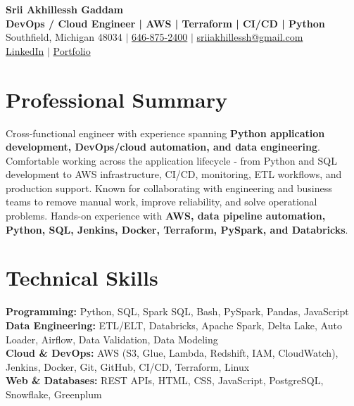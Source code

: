 \documentclass[letterpaper,10pt]{article}
\begin{document}
\fontsize{9.35pt}{10.45pt}\selectfont

\begin{center}
    {\LARGE \textbf{Srii Akhillessh Gaddam}} \\[-1pt]
    \textbf{DevOps / Cloud Engineer | AWS | Terraform | CI/CD | Python} \\[2pt]
    Southfield, Michigan 48034 $|$
    \href{tel:6468752400}{646-875-2400} $|$
    \href{mailto:sriiakhillessh@gmail.com}{sriiakhillessh@gmail.com} \\[1pt]
    \href{https://www.linkedin.com/in/srii-akhiilessh-gaddam-b48668191/}{LinkedIn} $|$
    \href{https://sriiakhillesshg.github.io/portfolio/}{Portfolio}
\end{center}
\vspace{-8pt}

\section{Professional Summary}
\small{Cross-functional engineer with experience spanning \textbf{Python application development, DevOps/cloud automation, and data engineering}. Comfortable working across the application lifecycle - from Python and SQL development to AWS infrastructure, CI/CD, monitoring, ETL workflows, and production support. Known for collaborating with engineering and business teams to remove manual work, improve reliability, and solve operational problems. Hands-on experience with \textbf{AWS, data pipeline automation, Python, SQL, Jenkins, Docker, Terraform, PySpark, and Databricks}.}

\section{Technical Skills}
\small{
\textbf{Programming:} Python, SQL, Spark SQL, Bash, PySpark, Pandas, JavaScript \\
\textbf{Data Engineering:} ETL/ELT, Databricks, Apache Spark, Delta Lake, Auto Loader, Airflow, Data Validation, Data Modeling \\
\textbf{Cloud \& DevOps:} AWS (S3, Glue, Lambda, Redshift, IAM, CloudWatch), Jenkins, Docker, Git, GitHub, CI/CD, Terraform, Linux \\
\textbf{Web \& Databases:} REST APIs, HTML, CSS, JavaScript, PostgreSQL, Snowflake, Greenplum
}
\end{document}
